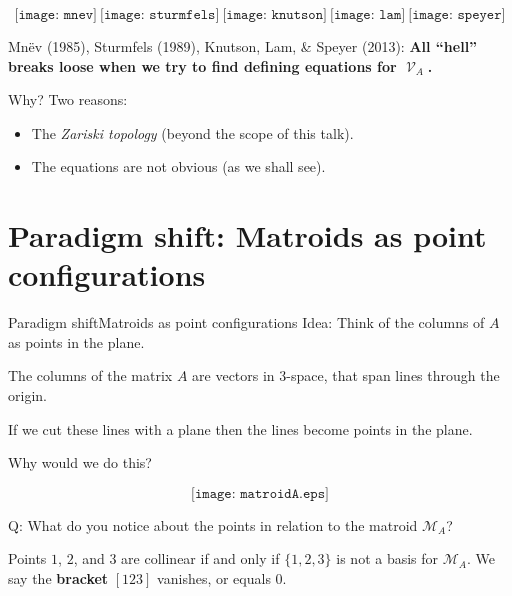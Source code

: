 \documentclass[%
	12pt]{beamer}
\theoremstyle{plain}
\theoremstyle{definition}
\DeclareMathOperator{\Var}{\mathcal V}
\begin{document}
\begin{frame}{}{}
\[
\texttt{[image: mnev]}
\
\texttt{[image: sturmfels]}
\
\texttt{[image: knutson]}
\
\texttt{[image: lam]}
\
\texttt{[image: speyer]}
\]

{\color{powCol} Mn\"ev (1985), Sturmfels (1989), Knutson, Lam, \& Speyer (2013): \textbf{All ``hell'' breaks loose when we try to find defining equations for $\Var_A$.}} 

\pause
\vspace{1pc}
Why?  \pause Two reasons: \pause
\begin{itemize}
\item The \emph{Zariski topology} (beyond the scope of this talk). \pause
\item The equations are not obvious (as we shall see).
\end{itemize} 
\end{frame}

\section{Paradigm shift: Matroids as point configurations}

\begin{frame}{Paradigm shift}{Matroids as point configurations}
{\color{powCol}Idea:} Think of the columns of $A$ as points in the plane. 

\pause
\vspace{1pc}
The columns of the matrix $A$ are vectors in 3-space, that span lines through the origin.

\vspace{1pc}
If we cut these lines with a plane then the lines become points in the plane.

\pause
\vspace{1pc}
Why would we do this?
\end{frame}

\begin{frame}{}{}
\[
\texttt{[image: matroidA.eps]}
\]

{\color{powCol}Q:} What do you notice about the points in relation to the matroid $\mathscr M_A$?

\pause
\vspace{1pc}
Points $1$, $2$, and $3$ are collinear if and only if $\{1,2,3\}$ is not a basis for $\mathscr M_A$.  We say the \textbf{bracket} $[123]$ vanishes, or equals 0.  
\end{frame}
\end{document}
